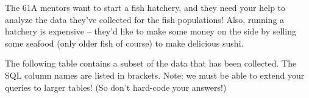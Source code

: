 The 61A mentors want to start a fish hatchery, and they need your help to analyze the data they've collected for the fish populations! Also, running a hatchery is expensive -- they'd like to make some money on the side by selling some seafood (only older fish of course) to make delicious sushi.

The following table contains a subset of the data that has been collected. The SQL column names are listed in brackets. Note: we must be able to extend your queries to larger tables! (So don't hard-code your answers!)